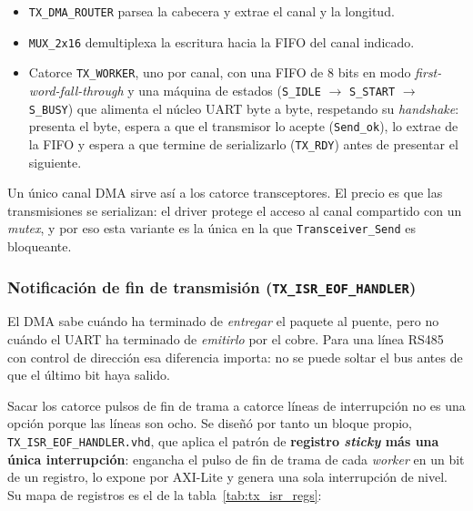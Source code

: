 \begin{itemize}
    \item \texttt{TX\_DMA\_ROUTER} parsea la cabecera y extrae el canal y la longitud.
    \item \texttt{MUX\_2x16} demultiplexa la escritura hacia la FIFO del canal indicado.
    \item Catorce \texttt{TX\_WORKER}, uno por canal, con una FIFO de 8 bits en modo
    \textit{first-word-fall-through} y una máquina de estados (\texttt{S\_IDLE} $\rightarrow$
    \texttt{S\_START} $\rightarrow$ \texttt{S\_BUSY}) que alimenta el núcleo UART byte a byte,
    respetando su \textit{handshake}: presenta el byte, espera a que el transmisor lo acepte
    (\texttt{Send\_ok}), lo extrae de la FIFO y espera a que termine de serializarlo
    (\texttt{TX\_RDY}) antes de presentar el siguiente.
\end{itemize}

Un único canal DMA sirve así a los catorce transceptores. El precio es que las transmisiones se
serializan: el driver protege el acceso al canal compartido con un \textit{mutex}, y por eso
esta variante es la única en la que \texttt{Transceiver\_Send} es bloqueante.

\subsubsection{Notificación de fin de transmisión (\texttt{TX\_ISR\_EOF\_HANDLER})}

El DMA sabe cuándo ha terminado de \textit{entregar} el paquete al puente, pero no cuándo el
UART ha terminado de \textit{emitirlo} por el cobre. Para una línea RS485 con control de
dirección esa diferencia importa: no se puede soltar el bus antes de que el último bit haya
salido.

Sacar los catorce pulsos de fin de trama a catorce líneas de interrupción no es una opción
porque las líneas son ocho. Se diseñó por tanto un bloque propio,
\texttt{TX\_ISR\_EOF\_HANDLER.vhd}, que aplica el patrón de \textbf{registro \textit{sticky} más
una única interrupción}: engancha el pulso de fin de trama de cada \textit{worker} en un bit de
un registro, lo expone por AXI-Lite y genera una sola interrupción de nivel. Su mapa de
registros es el de la tabla~\ref{tab:tx_isr_regs}:

